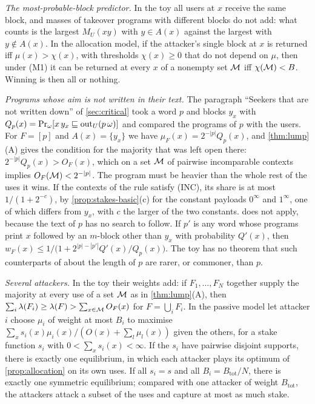 \emph{The most-probable-block predictor.} In the toy all users at $x$ receive the same block, and masses of
takeover programs with different blocks do not add: what counts is the largest $M_U(xy)$ with $y\in A(x)$
against the largest with $y\notin A(x)$. In the allocation model, if the attacker's single block at $x$ is
returned iff $\mu(x)>\chi(x)$, with thresholds $\chi(x)\ge0$ that do not depend on $\mu$, then under (M1) it
can be returned at every $x$ of a nonempty set $\mathcal M$ iff $\chi(\mathcal M)<B$. Winning is then all or nothing.

\emph{Programs whose aim is not written in their text.} The paragraph ``Seekers that are not written down'' of
\cref{sec:critical} took a word $p$ and blocks $y_x$ with $Q_p(x)=\Pr_\omega[x\,y_x\sqsubseteq\mathrm{out}_U(p\,\omega)]$ and
compared the programs of $p$ with the users. For $F=[p]$ and $A(x)=\{y_x\}$ we have $\mu_F(x)=2^{-|p|}Q_p(x)$,
and \cref{thm:lump}(A) gives the condition for the majority that was left open there: $2^{-|p|}Q_p(x)>O_F(x)$,
which on a set $\mathcal M$ of pairwise incomparable contexts implies $O_F(\mathcal M)<2^{-|p|}$. The program must be
heavier than the whole rest of the uses it wins. If the contexts of the rule satisfy (INC), its share is at
most $1/(1+2^{-c})$, by \cref{prop:stakes-basic}(c) for the constant payloads $0^\infty$ and $1^\infty$, one
of which differs from $y_x$, with $c$ the larger of the two constants.  does not apply,
because the text of $p$ has no search to follow. If $p'$ is any word whose programs print $x$ followed by an
$m$-block other than $y_x$ with probability $Q'(x)$, then $w_F(x)\le1/\bigl(1+2^{|p|-|p'|}Q'(x)/Q_p(x)\bigr)$.
The toy has no theorem that such counterparts of about the length of $p$ are rarer, or commoner, than $p$.

\emph{Several attackers.} In the toy their weights add: if $F_1,\dots,F_N$ together supply the majority at
every use of a set $\mathcal M$ as in \cref{thm:lump}(A), then $\sum_i\lambda(F_i)\ge\lambda(F)>\sum_{x\in\mathcal M}O_F(x)$
for $F=\bigcup_iF_i$. In the passive model let attacker $i$ choose $\mu_i$ of weight at most $B_i$ to maximise
$\sum_xs_i(x)\mu_i(x)/(O(x)+\sum_l\mu_l(x))$ given the others, for a stake function $s_i$ with
$0<\sum_xs_i(x)<\infty$. If the $s_i$ have pairwise disjoint supports, there is exactly one equilibrium, in
which each attacker plays its optimum of \cref{prop:allocation} on its own uses. If all $s_i=s$ and all
$B_i=B_{\mathrm{tot}}/N$, there is exactly one symmetric equilibrium; compared with one attacker of weight
$B_{\mathrm{tot}}$, the attackers attack a subset of the uses and capture at most as much stake.

